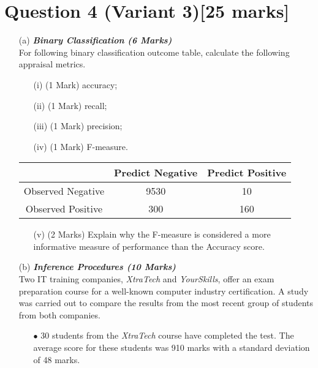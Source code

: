\documentclass[]{article}
\begin{document}
\section*{Question 4 (Variant 3)[25 marks]}

\begin{itemize}
\item[(a)] \textbf{\textit{Binary Classification (6 Marks)}}\\
For following binary classification outcome table, calculate the following appraisal metrics.
\begin{itemize}	
\item[(i)] (1 Mark)	accuracy;
\item[(ii)] (1 Mark)	recall;
\item[(iii)] (1 Mark)	precision;
\item[(iv)] (1 Mark)	F-measure.
\end{itemize}	

\begin{center}
\begin{tabular}{|c|c|c|}
\hline  & \phantom{spa}Predict Negative\phantom{spa} & \phantom{spa}Predict Positive\phantom{spa} \\ 
\hline\phantom{spa} Observed Negative \phantom{spa}&	9530	&	10	\\ 
\hline \phantom{spa}Observed Positive\phantom{spa} & 	300	&	160	\\ 
\hline 
\end{tabular} 
\end{center}

\begin{itemize}	
\item[(v)] (2 Marks) Explain why the F-measure is considered a more informative measure of performance than the Accuracy score.

\end{itemize}
\item[(b)] \textbf{\textit{Inference Procedures (10 Marks)}}\\
Two IT training companies, \textit{XtraTech} and \textit{YourSkills}, offer an exam preparation course for a well-known computer industry certification. A study was carried out to compare the results from the most recent group of students from both companies.
\begin{itemize}
\item[$\bullet$]30 students from the \textit{XtraTech} course have completed the test. The average score for these students was 910 marks with a standard deviation of 48 marks.


\end{itemize}
\end{itemize}
\end{document}
